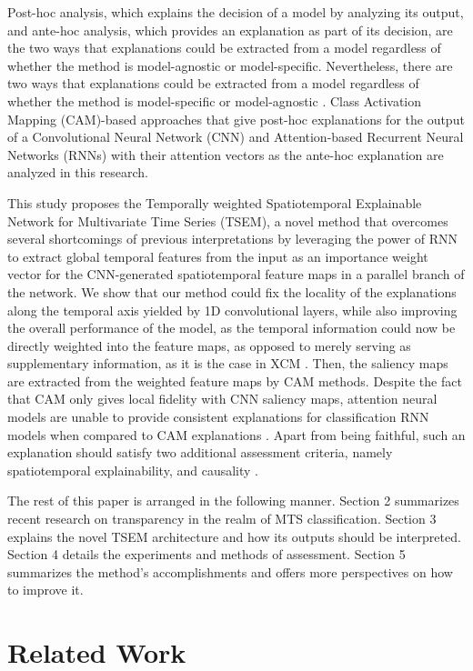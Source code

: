 \documentclass{svproc}
\begin{document}
Post-hoc analysis, which explains the decision of a model by analyzing its output, and ante-hoc analysis, which provides an explanation as part of its decision, are the two ways that explanations could be extracted from a model regardless of whether the method is model-agnostic or model-specific. Nevertheless, there are two ways that explanations could be extracted from a model regardless of whether the method is model-specific or model-agnostic \cite{holzinger2022xxai}. Class Activation Mapping (CAM)-based approaches that give post-hoc explanations for the output of a Convolutional Neural Network (CNN) and Attention-based Recurrent Neural Networks (RNNs) with their attention vectors as the ante-hoc explanation are analyzed in this research. 

This study proposes the Temporally weighted Spatiotemporal Explainable Network for Multivariate Time Series (TSEM), a novel method that overcomes several shortcomings of previous interpretations by leveraging the power of RNN to extract global temporal features from the input as an importance weight vector for the CNN-generated spatiotemporal feature maps in a parallel branch of the network. We show that our method could fix the locality of the explanations along the temporal axis yielded by 1D convolutional layers, while also improving the overall performance of the model, as the temporal information could now be directly weighted into the feature maps, as opposed to merely serving as supplementary information, as it is the case in XCM \cite{fauvel2021xcm}. Then, the saliency maps are extracted from the weighted feature maps by CAM methods. Despite the fact that CAM only gives local fidelity with CNN saliency maps, attention neural models are unable to provide consistent explanations for classification RNN models when compared to CAM explanations \cite{jain2019attention}. Apart from being faithful, such an explanation should satisfy two additional assessment criteria, namely spatiotemporal explainability, and causality \cite{gangopadhyay2021spatiotemporal}.

The rest of this paper is arranged in the following manner. Section 2 summarizes recent research on transparency in the realm of MTS classification. Section 3 explains the novel TSEM architecture and how its outputs should be interpreted. Section 4 details the experiments and methods of assessment. Section 5 summarizes the method's accomplishments and offers more perspectives on how to improve it. 
\section{Related Work}
\label{sec:rel}
\end{document}
